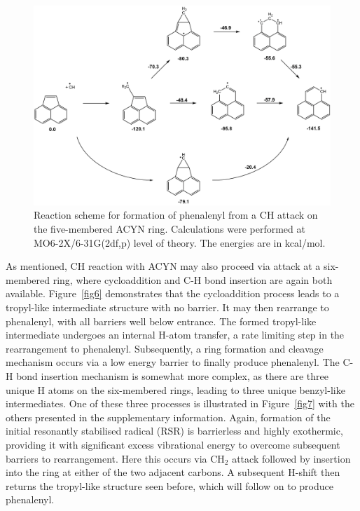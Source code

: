 \documentclass[journal=jacsat,manuscript=article,layout=onecolumn]{achemso}
\begin{document}
\begin{figure}[h!]
	\includegraphics[width=1\textwidth]{Figures/Figure5}
	\caption{Reaction scheme for formation of phenalenyl from a CH attack on the five-membered ACYN ring. Calculations were performed at MO6-2X/6-31G(2df,p) level of theory. The energies are in kcal/mol.}
	\label{fig5}
\end{figure}

As mentioned, CH reaction with ACYN may also proceed via attack at a six-membered ring, where cycloaddition and C-H bond insertion are again both available. Figure~\ref{fig6} demonstrates that the cycloaddition process leads to a tropyl-like intermediate structure with no barrier. It may then rearrange to phenalenyl, with all barriers well below entrance. The formed tropyl-like intermediate undergoes an internal H-atom transfer, a rate limiting step in the rearrangement to phenalenyl. Subsequently, a ring formation and cleavage mechanism occurs via a low energy barrier to finally produce phenalenyl. The C-H bond insertion mechanism is somewhat more complex, as there are three unique H atoms on the six-membered rings, leading to three unique benzyl-like intermediates. One of these three processes is illustrated in Figure~\ref{fig7} with the others presented in the supplementary information. Again, formation of the initial resonantly stabilised radical (RSR) is barrierless and highly exothermic, providing it with significant excess vibrational energy to overcome subsequent barriers to rearrangement. Here this occurs via CH$_2$ attack followed by insertion into the ring at either of the two adjacent carbons. A subsequent H-shift then returns the tropyl-like structure seen before, which will follow on to produce phenalenyl.  %
\end{document}
